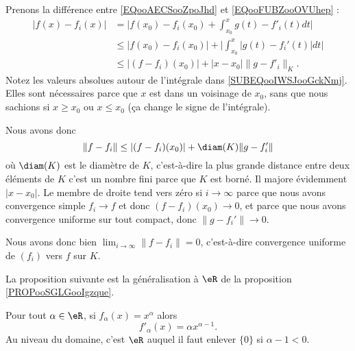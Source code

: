 \begin{normaltext}
\begin{subproof}
		Prenons la différence entre \eqref{EQooAECSooZpoJhd} et \eqref{EQooFUBZooOVUhep} :
		\begin{subequations}
			\begin{align}
				| f(x)-f_i(x) | & =\big| f(x_0)-f_i(x_0)+\int_{x_0}^x g(t)-f'_i(t)dt \big|                                               \\
				                & \leq | f(x_0)-f_i(x_0) |+\Big| \int_{x_0}^x| g(t)-f_i'(t) |dt  \Big|       \label{SUBEQooIWSJooGckNmj} \\
				                & \leq | (f-f_i)(x_0) |+| x-x_0 |\| g-f'_i \|_K.
			\end{align}
		\end{subequations}
		Notez les valeurs absolues autour de l'intégrale dans \eqref{SUBEQooIWSJooGckNmj}. Elles sont nécessaires parce que \( x\) est dans un voisinage de \( x_0\), sans que nous sachions si \( x\geq x_0\) ou \( x\leq x_0\) (ça change le signe de l'intégrale).

		Nous avons donc
		\begin{equation}
			\| f-f_i \|\leq | (f-f_i)(x_0) |+\diam(K)\| g-f'_i \|
		\end{equation}
		où \( \diam(K)\) est le diamètre de \( K\), c'est-à-dire la plus grande distance entre deux éléments de \( K\) c'est un nombre fini parce que \( K\) est borné. Il majore évidemment \( | x-x_0 |\). Le membre de droite tend vers zéro si \( i\to \infty\) parce que nous avons convergence simple \( f_i\to f\) et donc \( (f-f_i)(x_0)\to 0\), et parce que nous avons convergence uniforme sur tout compact, donc \( \| g-f_i' \|\to 0\).

		Nous avons donc bien \( \lim_{i\to \infty}\| f-f_i \|=0\), c'est-à-dire convergence uniforme de \( (f_i)\) vers \( f\) sur \( K\).

	\end{subproof}
\end{normaltext}

La proposition suivante est la généralisation à \( \eR\) de la proposition \ref{PROPooSGLGooIgzque}.
\begin{proposition}     \label{PROPooKIASooGngEDh}
	Pour tout \( \alpha\in \eR\), si \( f_{\alpha}(x)=x^{\alpha}\) alors
	\begin{equation}
		f'_{\alpha}(x)=\alpha x^{\alpha-1}.
	\end{equation}
	Au niveau du domaine, c'est \( \eR\) auquel il faut enlever \( \{ 0 \}\) si \( \alpha-1<0\).
\end{proposition}

